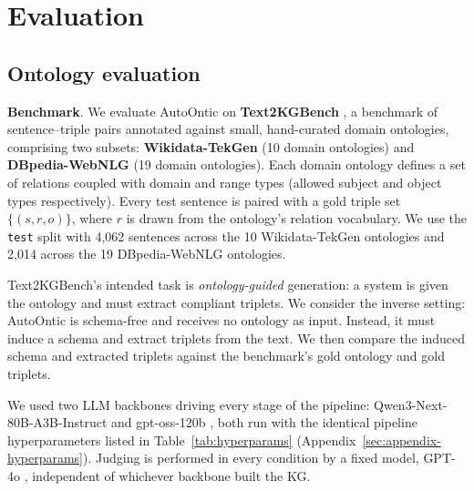 \documentclass[11pt]{article}
\begin{document}
\section{Evaluation}
\label{sec:evaluation}

\subsection{Ontology evaluation}
\label{sec:onto-eval}
\textbf{Benchmark}. We evaluate AutoOntic on \textbf{Text2KGBench}
\citep{mihindukulasooriya2023text2kgbench}, a benchmark of sentence--triple
pairs annotated against small, hand-curated domain ontologies, comprising
two subsets: \textbf{Wikidata-TekGen} (10 domain ontologies) and
\textbf{DBpedia-WebNLG} (19 domain ontologies). Each domain ontology
defines a set of relations coupled with domain and range types (allowed subject and object types respectively). Every test sentence is
paired with a gold triple set $\{(s, r, o)\}$, where $r$ is drawn from the ontology's
relation vocabulary. We use the \texttt{test} split with 4{,}062 sentences across the 10 Wikidata-TekGen ontologies and 2{,}014 across the 19 DBpedia-WebNLG ontologies. 


Text2KGBench's intended task is \emph{ontology-guided} generation: a system is given the ontology and must extract compliant triplets. We consider the inverse setting: AutoOntic is schema-free and receives no ontology as input. Instead, it must induce a schema and extract triplets from the text. We then compare the induced schema and extracted triplets against the benchmark's gold ontology and gold triplets.

We used two LLM backbones driving every stage of the pipeline: Qwen3-Next-80B-A3B-Instruct
\citep{qwen2025qwen3} and gpt-oss-120b \citep{openai2025gptoss}, both run with the identical pipeline hyperparameters listed in Table~\ref{tab:hyperparams} (Appendix~\ref{sec:appendix-hyperparams}). Judging is performed in every condition by a fixed model, GPT-4o
\citep{openai2024gpt4o}, independent of whichever backbone built the KG. 


\end{document}
